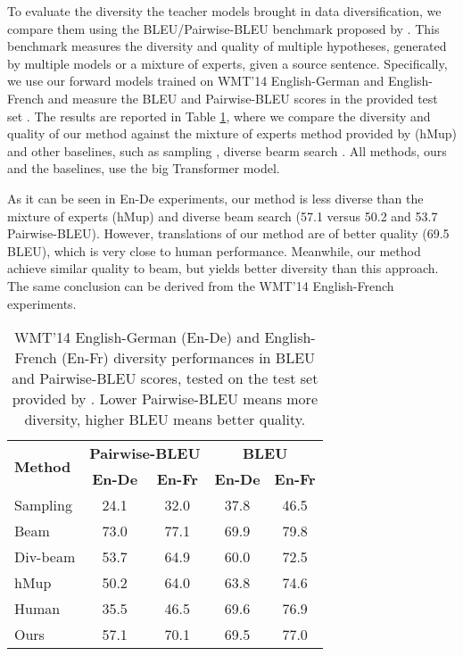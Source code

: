 \documentclass{article}
\begin{document}
{To evaluate the diversity the teacher models brought in data diversification, we compare them using the BLEU/Pairwise-BLEU benchmark proposed by \citet{mixture_model_nmt_shen2019}. This benchmark measures the diversity and quality of multiple hypotheses, generated by multiple models or a mixture of experts, given a source sentence. Specifically, we use our forward models trained on WMT'14 English-German and English-French and measure the BLEU and Pairwise-BLEU scores in the provided test set \citep{mixture_model_nmt_shen2019}. The results are reported in Table \ref{table:diversity}, where we compare the diversity and quality of our method against the mixture of experts method provided by \citet{mixture_model_nmt_shen2019} (hMup) and other baselines, such as sampling \citep{biased_sampling_graves2013generating}, diverse bearm search \citep{diverse_beamli2016simple}.} All methods, ours and the baselines, use the big Transformer model.



{As it can be seen in En-De experiments, our method is less diverse than the mixture of experts (hMup) \citep{mixture_model_nmt_shen2019} and diverse beam search \citep{diverse_beamli2016simple} (57.1 versus 50.2 and 53.7 Pairwise-BLEU). However, translations of our method are of better quality (69.5 BLEU), which is very close to human performance. Meanwhile, our method achieve similar quality to beam, but yields better diversity than this approach. The same conclusion can be derived from the WMT'14 English-French experiments.}





\begin{table}[t]
\begin{center}
\caption{{WMT'14 English-German (En-De) and English-French (En-Fr) diversity performances in BLEU and Pairwise-BLEU scores, tested on the test set provided by \citet{mixture_model_nmt_shen2019}.} Lower Pairwise-BLEU means more diversity, higher BLEU means better quality.}
\begin{tabular}{lcccc}
\toprule
\multirow{2}{*}{\bf Method}   & \multicolumn{2}{c}{\bf Pairwise-BLEU}  & \multicolumn{2}{c}{\bf BLEU}\\
\cmidrule{2-5}
                           & \textbf{En-De} & \textbf{En-Fr}    & \textbf{En-De} & \textbf{En-Fr}\\
\midrule
Sampling            & 24.1 & 32.0  & 37.8 & 46.5 \\
Beam                & 73.0 & 77.1  & 69.9 & 79.8 \\
Div-beam            & 53.7 & 64.9  & 60.0 & 72.5 \\
hMup                & 50.2 & 64.0  & 63.8 & 74.6 \\
\midrule
Human               & 35.5 & 46.5  & 69.6 & 76.9 \\
\midrule
Ours                & 57.1 & 70.1  & 69.5 & 77.0  \\
\bottomrule
\end{tabular}
\label{table:diversity}
\end{center}
\end{table}
\end{document}
